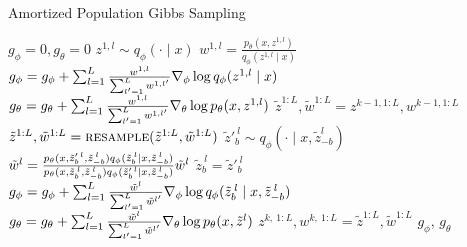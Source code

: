 \documentclass{article}
\theoremstyle{definition}
\begin{document}
\begin{algorithm}[!tb]
  \caption{Amortized Population Gibbs Sampling}
  \label{alg:amortized-gibbs}
\begin{algorithmic}[1]
\small
  \State $g_\phi = 0, g_\theta = 0$\label{line:init-grad}
  \label{line:rws-loop}
      \State $z^{1,l} \sim q_\phi(\cdot \mid x)$\label{line:rws-propose}
      \State $w^{1,l} = \frac{p_\theta(x, z^{1,l})}{q_\phi(z^{1,l} \mid x)}$\label{line:rws-weight}
  \EndFor
  \State $g_\phi = g_\phi + \sum_{l = 1}^L \frac{w^{1,l}}{\sum_{l' = 1}^L w^{1,l'}} \nabla_\phi \log q_\phi(z^{1,l} \mid x)$\label{line:rws-grad-phi}
  \State $g_\theta = g_\theta + \sum_{l = 1}^L \frac{w^{1,l}}{\sum_{l' = 1}^L w^{1,l'}} \nabla_\theta \log p_\theta(x, z^{1,l})$\label{line:rws-grad-theta}
  \label{line:sweep-loop}
    \State $\tilde{z}^{1:L}, \tilde{w}^{1:L} = z^{k-1,1:L}, w^{k-1,1:L}$ \label{line:apg-sweep-begin}
    \label{line:block-loop}
      \State $\tilde{z}^{1:L}, \tilde{w}^{1:L}=\textsc{resample}(\tilde{z}^{1:L}, \tilde{w}^{1:L})$\label{line:resample} 
        \label{line:apg-sample-loop}
          \State $\tilde{z}'^{\:l}_b \sim q_\phi(\cdot \mid x, \tilde{z}_{-b}^l)$\label{line:apg-propose}
          \State \label{line:apg-weight} $\tilde{w}^l = \frac{p_\theta(x, \tilde{z}'^{\:l}_{b}, \tilde{z}^{\:l}_{-b}) q_\phi(\tilde{z}^{\:l}_b \mid x, \tilde{z}^{\:l}_{-b})}{p_\theta(x, \tilde{z}^{\:l}_b, \tilde{z}^{\:l}_{-b}) q_\phi(\tilde{z}'^{\:l}_b \mid x, \tilde{z}^{\:l}_{-b})}\tilde{w}^l$ 
          \State \label{line:apg-reassign}$\tilde{z}^{\:l}_b = \tilde{z}'^{\:l}_b$ 
      \EndFor
      \State $g_\phi=g_\phi+ \sum_{l = 1}^L\frac{\tilde{w}^l}{\sum_{l'= 1}^L \tilde{w}^{l'}} \nabla_\phi\log q_\phi(\tilde{z}^{\:l}_b \mid x, \tilde{z}^{\:l}_{-b})$\label{line:apg-grad-phi}
      \State $g_\theta = g_\theta + \sum_{l = 1}^L \frac{\tilde{w}^l}{\sum_{l' = 1}^L \tilde{w}^{l'}} \nabla_\theta \log p_\theta(x, \tilde{z}^l)$ \label{line:apg-grad-theta}
     \EndFor
     \State $z^{k,\:1:L}, w^{k,\:1:L} = \tilde{z}^{1:L}, \tilde{w}^{1:L}$\label{line:apg-sweep-end}
     \vspace{0.5em}
  \EndFor
  \Return $g_\phi$, $g_\theta$
\end{algorithmic}
\end{algorithm}
\end{document}
